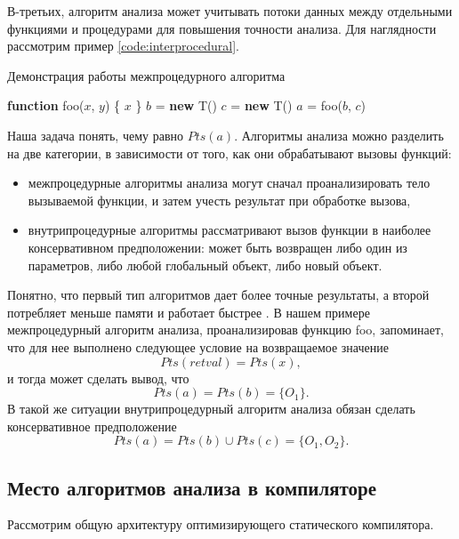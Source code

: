 \documentclass[14pt,titlepage]{extarticle}
\newcommand{\NEW}{\textbf{new }}
\newcommand{\FUNCTION}{\textbf{function }}
\begin{document}
      В-третьих, алгоритм анализа может учитывать потоки данных между отдельными
      функциями и процедурами для повышения точности анализа.
      Для наглядности рассмотрим пример \ref{code:interprocedural}.
      \begin{algorithm}
        \caption{Демонстрация работы межпроцедурного алгоритма}
        \label{code:interprocedural}
        \begin{algorithmic}[1]
          \STATE \FUNCTION foo($x$, $y$) \{
          \RETURN $x$
          \STATE \}
          \STATE
          \STATE $b$ = \NEW T()
          \STATE $c$ = \NEW T()
          \STATE $a$ = foo($b$, $c$)
        \end{algorithmic}
      \end{algorithm}

      Наша задача понять, чему равно $Pts(a)$.
      Алгоритмы анализа можно разделить на две категории, в зависимости от того,
      как они обрабатывают вызовы функций:
      \begin{itemize}
        \item межпроцедурные алгоритмы анализа могут сначал проанализировать
              тело вызываемой функции, и затем учесть результат при обработке
              вызова,
        \item внутрипроцедурные алгоритмы рассматривают вызов функции в наиболее
              консервативном предположении: может быть возвращен либо один из
              параметров, либо любой глобальный объект, либо новый объект.
      \end{itemize}
      Понятно, что первый тип алгоритмов дает более точные результаты,
      а второй потребляет меньше памяти и работает быстрее
      \cite[с.~117]{andersen}.
      В нашем примере межпроцедурный алгоритм анализа, проанализировав функцию
      foo, запоминает, что для нее выполнено следующее условие на возвращаемое
      значение
      \[Pts(retval) = Pts(x),\]
      и тогда может сделать вывод, что \[Pts(a) = Pts(b) = \{O_1\}.\]
      В такой же ситуации внутрипроцедурный алгоритм анализа обязан сделать
      консервативное предположение
      \[Pts(a) = Pts(b) \cup Pts(c) = \{O_1, O_2\}.\]

    \subsection{Место алгоритмов анализа в компиляторе}

      Рассмотрим общую архитектуру оптимизирующего статического компилятора.
\end{document}
